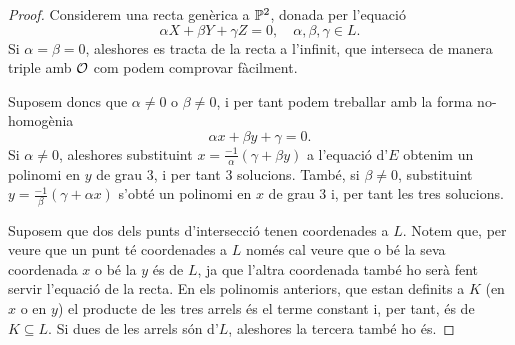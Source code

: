 \begin{proof}
Considerem una recta genèrica a $\P^2$, donada per l'equació
\[
\alpha X+\beta Y+\gamma Z=0, \quad \alpha,\beta,\gamma\in L.
\]
Si $\alpha=\beta=0$, aleshores es tracta de la recta a l'infinit, que interseca de manera triple amb $\calO$ com podem comprovar fàcilment.

Suposem doncs que $\alpha\neq 0$ o $\beta\neq 0$, i per tant podem treballar amb la forma no-homogènia
\[
\alpha x + \beta y + \gamma = 0.
\]
Si $\alpha \neq 0$, aleshores substituint $x = \frac{-1}{\alpha} (\gamma + \beta y)$ a l'equació d'$E$ obtenim un polinomi en $y$ de grau $3$, i per tant $3$ solucions. També, si $\beta\neq 0$, substituint $y=\frac{-1}{\beta}(\gamma + \alpha x)$ s'obté un polinomi en $x$ de grau $3$ i, per tant les tres solucions.

Suposem que dos dels punts d'intersecció tenen coordenades a $L$. Notem que, per veure que un punt té coordenades a $L$ només cal veure que o bé la seva coordenada $x$ o bé la $y$ és de $L$, ja que l'altra coordenada també ho serà fent servir l'equació de la recta. En els polinomis anteriors, que estan definits a $K$ (en $x$ o en $y$) el producte de les tres arrels és el terme constant i, per tant, és de $K\subseteq L$. Si dues de les arrels són d'$L$, aleshores la tercera també ho és.

\end{proof}


